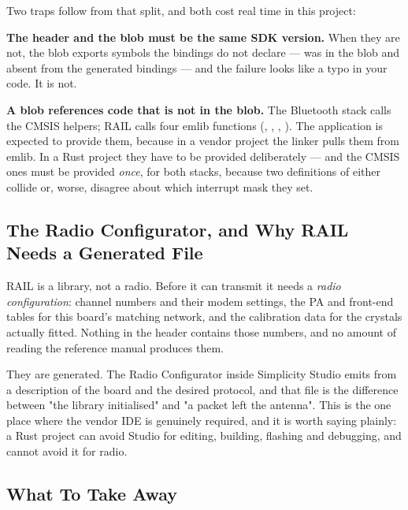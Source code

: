 Two traps follow from that split, and both cost real time in this project:

\textbf{The header and the blob must be the same SDK version.} When they are not, the blob exports
symbols the bindings do not declare —  was in the blob and
absent from the generated bindings — and the failure looks like a typo in your code. It is not.

\textbf{A blob references code that is not in the blob.} The Bluetooth stack calls the CMSIS
 helpers; RAIL calls four emlib functions
(, ,
, ). The application is expected to
provide them, because in a vendor project the linker pulls them from emlib. In a Rust project they
have to be provided deliberately — and the CMSIS ones must be provided \emph{once}, for both stacks,
because two definitions of  either collide or, worse, disagree about
which interrupt mask they set.

\subsection{The Radio Configurator, and Why RAIL Needs a Generated File}

RAIL is a library, not a radio. Before it can transmit it needs a \emph{radio configuration}:
channel numbers and their modem settings, the PA and front-end tables for this board's matching
network, and the calibration data for the crystals actually fitted. Nothing in the header contains
those numbers, and no amount of reading the reference manual produces them.

They are generated. The Radio Configurator inside Simplicity Studio emits 
from a description of the board and the desired protocol, and that file is the difference between
"the library initialised" and "a packet left the antenna". This is the one place where the vendor
IDE is genuinely required, and it is worth saying plainly: a Rust project can avoid Studio for
editing, building, flashing and debugging, and cannot avoid it for radio.

\subsection{What To Take Away}

